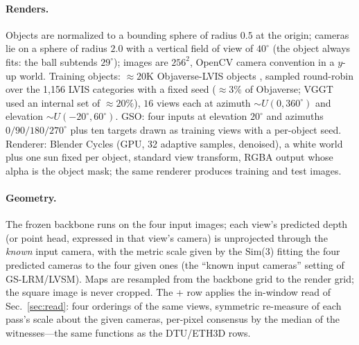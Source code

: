 \paragraph{Renders.} Objects are normalized to a bounding sphere of radius
$0.5$ at the origin; cameras lie on a sphere of radius $2.0$ with a vertical
field of view of $40^\circ$ (the object always fits: the ball subtends
$29^\circ$); images are $256^2$, OpenCV camera convention in a $y$-up world.
Training objects: ${\approx}20$K Objaverse-LVIS objects \citep{objaverse},
sampled round-robin over the 1{,}156 LVIS categories with a fixed seed
(${\approx}3\%$ of Objaverse; VGGT used an internal set of ${\approx}20\%$),
$16$ views each at azimuth $\sim U(0,360^\circ)$ and elevation
$\sim U(-20^\circ,60^\circ)$. GSO: four inputs at elevation $20^\circ$ and
azimuths $0/90/180/270^\circ$ plus ten targets drawn as training views with a
per-object seed. Renderer: Blender Cycles (GPU, 32 adaptive samples,
denoised), a white world plus one sun fixed per object, standard view
transform, RGBA output whose alpha is the object mask; the same renderer
produces training and test images.

\paragraph{Geometry.} The frozen backbone runs on the four input images; each
view's predicted depth (or point head, expressed in that view's camera) is
unprojected through the \emph{known} input camera, with the metric scale given
by the Sim(3) fitting the four predicted cameras to the four given ones (the
``known input cameras'' setting of GS-LRM/LVSM). Maps are resampled from the
backbone grid to the render grid; the square image is never cropped. The
+\smr{} row applies the in-window read of Sec.~\ref{sec:read}: four orderings
of the same views, symmetric re-measure of each pass's scale about the given
cameras, per-pixel consensus by the median of the witnesses---the same
functions as the DTU/ETH3D rows.

